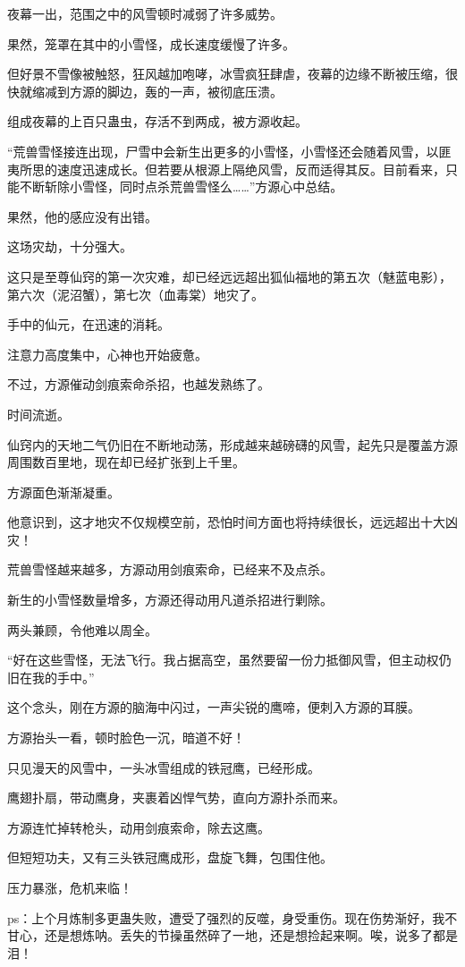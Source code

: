 \begin{this_body}
夜幕一出，范围之中的风雪顿时减弱了许多威势。

果然，笼罩在其中的小雪怪，成长速度缓慢了许多。

但好景不雪像被触怒，狂风越加咆哮，冰雪疯狂肆虐，夜幕的边缘不断被压缩，很快就缩减到方源的脚边，轰的一声，被彻底压溃。

组成夜幕的上百只蛊虫，存活不到两成，被方源收起。

“荒兽雪怪接连出现，尸雪中会新生出更多的小雪怪，小雪怪还会随着风雪，以匪夷所思的速度迅速成长。但若要从根源上隔绝风雪，反而适得其反。目前看来，只能不断斩除小雪怪，同时点杀荒兽雪怪么……”方源心中总结。

果然，他的感应没有出错。

这场灾劫，十分强大。

这只是至尊仙窍的第一次灾难，却已经远远超出狐仙福地的第五次（魅蓝电影），第六次（泥沼蟹），第七次（血毒棠）地灾了。

手中的仙元，在迅速的消耗。

注意力高度集中，心神也开始疲惫。

不过，方源催动剑痕索命杀招，也越发熟练了。

时间流逝。

仙窍内的天地二气仍旧在不断地动荡，形成越来越磅礴的风雪，起先只是覆盖方源周围数百里地，现在却已经扩张到上千里。

方源面色渐渐凝重。

他意识到，这才地灾不仅规模空前，恐怕时间方面也将持续很长，远远超出十大凶灾！

荒兽雪怪越来越多，方源动用剑痕索命，已经来不及点杀。

新生的小雪怪数量增多，方源还得动用凡道杀招进行剿除。

两头兼顾，令他难以周全。

“好在这些雪怪，无法飞行。我占据高空，虽然要留一份力抵御风雪，但主动权仍旧在我的手中。”

这个念头，刚在方源的脑海中闪过，一声尖锐的鹰啼，便刺入方源的耳膜。

方源抬头一看，顿时脸色一沉，暗道不好！

只见漫天的风雪中，一头冰雪组成的铁冠鹰，已经形成。

鹰翅扑扇，带动鹰身，夹裹着凶悍气势，直向方源扑杀而来。

方源连忙掉转枪头，动用剑痕索命，除去这鹰。

但短短功夫，又有三头铁冠鹰成形，盘旋飞舞，包围住他。

压力暴涨，危机来临！

ps：上个月炼制多更蛊失败，遭受了强烈的反噬，身受重伤。现在伤势渐好，我不甘心，还是想炼呐。丢失的节操虽然碎了一地，还是想捡起来啊。唉，说多了都是泪！

\end{this_body}

